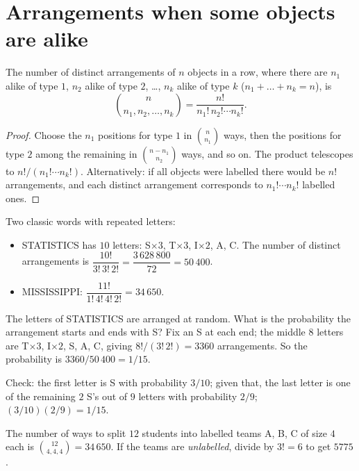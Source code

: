 \section{Arrangements when some objects are alike}

\begin{theorem}
The number of distinct arrangements of $n$ objects in a row, where there are $n_1$ alike
of type $1$, $n_2$ alike of type $2$, \dots, $n_k$ alike of type $k$
($n_1+\dots+n_k = n$), is
\[
  \binom{n}{n_1, n_2, \dots, n_k} = \frac{n!}{n_1!\, n_2! \cdots n_k!}.
\]
\end{theorem}

\begin{proof}
Choose the $n_1$ positions for type $1$ in $\binom{n}{n_1}$ ways, then the positions for
type $2$ among the remaining in $\binom{n-n_1}{n_2}$ ways, and so on. The product
telescopes to $n!/(n_1!\cdots n_k!)$. Alternatively: if all objects were labelled there
would be $n!$ arrangements, and each distinct arrangement corresponds to
$n_1!\cdots n_k!$ labelled ones.
\end{proof}

\begin{example}[Words]
Two classic words with repeated letters:
\begin{itemize}
  \item STATISTICS has $10$ letters: S$\times3$, T$\times3$, I$\times2$, A, C. The number of
        distinct arrangements is $\dfrac{10!}{3!\,3!\,2!} = \dfrac{3\,628\,800}{72} = 50\,400$.
  \item MISSISSIPPI: $\dfrac{11!}{1!\,4!\,4!\,2!} = 34\,650$.
\end{itemize}
\end{example}

\begin{example}
The letters of STATISTICS are arranged at random. What is the probability the arrangement
starts and ends with S? Fix an S at each end; the middle $8$ letters are T$\times3$,
I$\times2$, S, A, C, giving $8!/(3!\,2!) = 3360$ arrangements. So the probability is
$3360/50\,400 = 1/15$.

Check: the first letter is S with probability $3/10$; given that, the last letter is one
of the remaining $2$ S's out of $9$ letters with probability $2/9$; $(3/10)(2/9) = 1/15$.
\end{example}

\begin{example}
The number of ways to split $12$ students into labelled teams A, B, C of size $4$ each is
$\binom{12}{4,4,4} = 34\,650$. If the teams are \emph{unlabelled}, divide by $3! = 6$ to
get $5775$.
\end{example}

